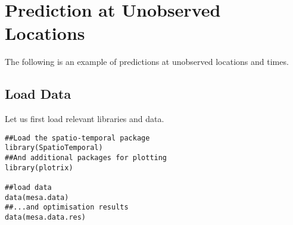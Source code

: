 \section{Prediction at Unobserved Locations} \label{app:pred_unobs}
The following is an example of predictions at unobserved locations and times.

\subsection{Load Data}
Let us first load relevant libraries and data.
\vspace*{-0.5\baselineskip}
\begin{verbatim}
##Load the spatio-temporal package
library(SpatioTemporal)
##And additional packages for plotting
library(plotrix) 

##load data
data(mesa.data)
##...and optimisation results
data(mesa.data.res)
\end{verbatim}

